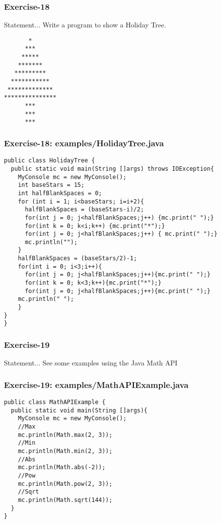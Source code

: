 \documentclass[xcolor=dvipsnames,dvip,notes=show,table]{beamer}
\begin{document}
\begin{frame}[fragile]
\frametitle{Exercise-18}
\begin{block}{Statement...}
 Write a program to show a Holiday Tree.
\end{block}

\begin{lstlisting}
       *
      ***
     *****
    *******
   *********
  ***********
 *************
***************
      ***
      ***
      ***
\end{lstlisting}



\end{frame}


\begin{frame}[fragile]
\frametitle{Exercise-18: examples/HolidayTree.java}
\tiny
\begin{lstlisting}
public class HolidayTree {
  public static void main(String []args) throws IOException{
    MyConsole mc = new MyConsole();
    int baseStars = 15;
    int halfBlankSpaces = 0;
    for (int i = 1; i<baseStars; i=i+2){
      halfBlankSpaces = (baseStars-i)/2;
      for(int j = 0; j<halfBlankSpaces;j++) {mc.print(" ");}
      for(int k = 0; k<i;k++) {mc.print("*");}
      for(int j = 0; j<halfBlankSpaces;j++) { mc.print(" ");}
      mc.println("");
    }
    halfBlankSpaces = (baseStars/2)-1;
    for(int i = 0; i<3;i++){
      for(int j = 0; j<halfBlankSpaces;j++){mc.print(" ");}
      for(int k = 0; k<3;k++){mc.print("*");}
      for(int j = 0; j<halfBlankSpaces;j++){mc.print(" ");}
    mc.println(" ");
    }
}
}
\end{lstlisting}
\end{frame}


\begin{frame}[fragile]
\frametitle{Exercise-19}
\begin{block}{Statement...}
  See some examples using the Java Math API
\end{block}

\end{frame}


\begin{frame}[fragile]
\frametitle{Exercise-19: examples/MathAPIExample.java}
\tiny
\begin{lstlisting}
public class MathAPIExample {
  public static void main(String []args){
    MyConsole mc = new MyConsole();
    //Max
    mc.println(Math.max(2, 3));
    //Min
    mc.println(Math.min(2, 3));
    //Abs		
    mc.println(Math.abs(-2));
    //Pow
    mc.println(Math.pow(2, 3));
    //Sqrt
    mc.println(Math.sqrt(144));
  }
}
\end{lstlisting}
\end{frame}
\end{document}
